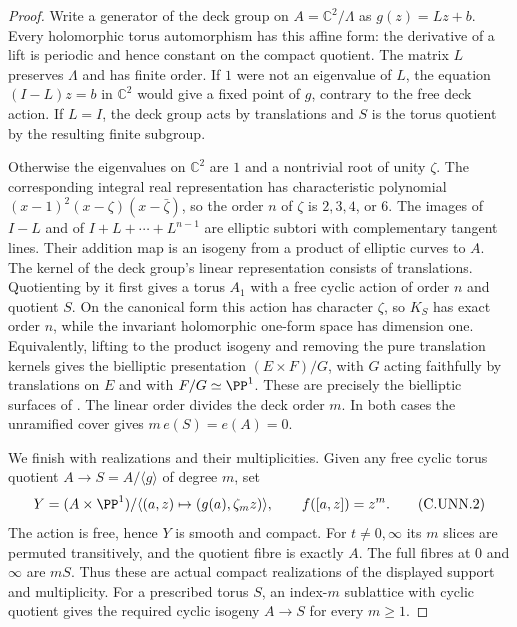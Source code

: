 \begin{proof}
Write a generator of the deck group on
$A=\mathbb C^2/\Lambda$ as $g(z)=Lz+b$.
Every holomorphic torus automorphism has this affine
form: the derivative of a lift is periodic and hence
constant on the compact quotient. The matrix $L$
preserves $\Lambda$ and has finite order. If $1$
were not an eigenvalue of $L$, the equation
$(I-L)z=b$ in $\mathbb C^2$ would give a fixed
point of $g$, contrary to the free deck action.
If $L=I$, the deck group acts by translations and
$S$ is the torus quotient by the resulting finite
subgroup.

Otherwise the eigenvalues on $\mathbb C^2$ are
$1$ and a nontrivial root of unity $\zeta$.
The corresponding integral real representation
has characteristic polynomial
$(x-1)^2(x-\zeta)(x-\bar\zeta)$, so the order
$n$ of $\zeta$ is $2,3,4$, or $6$. The images of
$I-L$ and of $I+L+\cdots+L^{n-1}$ are elliptic
subtori with complementary tangent lines. Their
addition map is an isogeny from a product of
elliptic curves to $A$. The kernel of the deck
group's linear representation consists of
translations. Quotienting by it first gives a
torus $A_1$ with a free cyclic action of order
$n$ and quotient $S$. On the canonical form
this action has character $\zeta$, so $K_S$
has exact order $n$, while the invariant
holomorphic one-form space has dimension one.
Equivalently, lifting to the product isogeny
and removing the pure translation kernels gives
the bielliptic presentation
$(E\times F)/G$, with $G$ acting faithfully
by translations on $E$ and with $F/G\simeq\PP^1$.
These are precisely the bielliptic surfaces
of \cite[Definition~3.1 and Theorems~3.2--3.3]{Catanese2002}.
The linear order divides the deck order $m$.
In both cases the unramified cover gives
$m\,e(S)=e(A)=0$.

We finish with realizations and their multiplicities.
Given any free cyclic torus quotient
$A\to S=A/\langle g\rangle$ of degree $m$, set
\[
 Y=(A\times\PP^1)/\langle(a,z)\mapsto
                         (g(a),\zeta_m z)\rangle,
 \qquad f([a,z])=z^m.
 \tag{C.UNN.2}\label{cdp:eq:C.UNN.2}
\]
The action is free, hence $Y$ is smooth and compact.
For $t\ne0,\infty$ its $m$ slices are permuted
transitively, and the quotient fibre is exactly
$A$. The full fibres at $0$ and $\infty$ are
$mS$. Thus these are actual compact realizations
of the displayed support and multiplicity.
For a prescribed torus $S$, an index-$m$ sublattice
with cyclic quotient gives the required cyclic
isogeny $A\to S$ for every $m\ge1$.


\end{proof}
